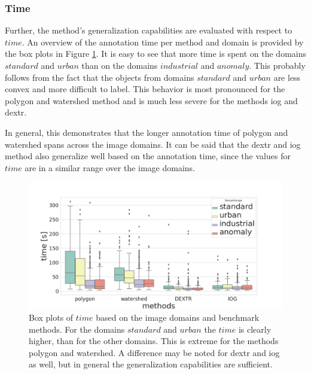 
\subsubsection{Time}
Further, the method's generalization capabilities are evaluated with respect to $ time $.
An overview of the annotation time per method and domain is provided by the box plots in Figure \ref{fig:ch5:sec2:methods_over_domain_time}.
It is easy to see that more time is spent on the domains $ standard $ and $ urban $ than on the domains $ industrial $ and $ anomaly $.
This probably follows from the fact that the objects from domains $ standard $ and $ urban $ are less convex and more difficult to label.
This behavior is most pronounced for the polygon and watershed method and is much less severe for the methods \gls{iog} and \gls{dextr}.

In general, this demonstrates that the longer annotation time of polygon and watershed spans across the image domains.
It can be said that the \gls{dextr} and \gls{iog} method also generalize well based on the annotation time, since the values for $ time $ are in a similar range over the image domains.

\begin{figure}[h!]
	\centering
	\includegraphics[width=\textwidth]{figures/chap52_time_methods_over_domains_boxplot.png}
	\caption[Box plots of image domains and methods on  $ time $]{
		Box plots of $ time $ based on the image domains and benchmark methods.
		For the domains $ standard $ and $ urban $ the $ time $ is clearly higher, than for the other domains.
		This is extreme for the methods polygon and watershed.
		A difference may be noted for \gls{dextr} and \gls{iog} as well, but in general the generalization capabilities are sufficient.	
	} \label{fig:ch5:sec2:methods_over_domain_time}
\end{figure}

